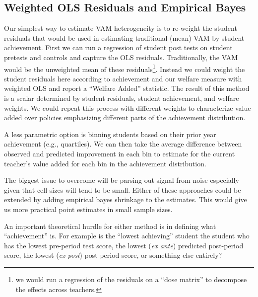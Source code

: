 \documentclass[letterpaper,12pt]{article}
\begin{document}
\subsection{Weighted OLS Residuals and Empirical Bayes}
Our simplest way to estimate VAM heterogeneity is to re-weight the student residuals that would be used in estimating traditional (mean) VAM by student achievement. First we can run a regression of student post tests on student pretests and controls and capture the OLS residuals. Traditionally, the VAM would be the unweighted mean of these residuals\footnote{we would run a regression of the residuals on a ``dose matrix'' to decompose the effects across teachers.}. Instead  we could weight the student residuals here according to achievement and our welfare measure with weighted OLS and report a ``Welfare Added'' statistic. The result of this method is a scalar determined by student residuals, student achievement, and welfare weights. We could repeat this process with different weights to characterize value added over policies emphasizing different parts of the achievement distribution.

A less parametric option is binning students based on their prior year achievement (e.g., quartiles). We can then take the average difference between observed and predicted improvement in each bin to estimate for the current teacher's value added for each bin in the achievement distribution.

The biggest issue to overcome will be parsing out signal from noise especially given that cell sizes will tend to be small. Either of these approaches could be extended by adding empirical bayes shrinkage to the estimates. This would give us more practical point estimates in small sample sizes. 

An important theoretical hurdle for either  method is in defining what ``achievement'' is. For example is the ``lowest achieving'' student the student who has the lowest pre-period test score, the lowest (\textit{ex ante}) predicted post-period score, the lowest (\textit{ex post}) post period score,  or something else entirely? 


\end{document}

